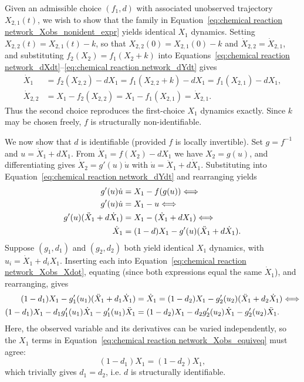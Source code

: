 \documentclass{article}
\theoremstyle{plain}
\theoremstyle{definition}
\begin{document}
{Given an admissible choice $(f_1, d)$ with associated unobserved trajectory $X_{2,1}(t)$, we wish to show that the family in Equation~\eqref{eq:chemical reaction network_Xobs_nonident_expr} yields identical $X_1$ dynamics. Setting $X_{2,2}(t) = X_{2,1}(t) - k$, so that $X_{2,2}(0) = X_{2,1}(0) - k$ and $\dot{X}_{2,2} = \dot{X}_{2,1}$, and substituting $f_2(X_2) = f_1(X_2+k)$ into Equations~\eqref{eq:chemical reaction network_dXdt}--\eqref{eq:chemical reaction network_dYdt} gives
\begin{align*}
    \dot{X}_1 &= f_2(X_{2,2}) - dX_1 = f_1(X_{2,2} + k) - dX_1 = f_1(X_{2,1}) - dX_1, \\
    \dot{X}_{2,2} &= X_1 - f_2(X_{2,2}) = X_1 - f_1(X_{2,1}) = \dot{X}_{2,1}.
\end{align*}
Thus the second choice reproduces the first-choice $X_1$ dynamics exactly. Since $k$ may be chosen freely, $f$ is structurally non-identifiable.

We now show that $d$ is identifiable (provided $f$ is locally invertible). Set $g = f^{-1}$ and $u = \dot{X}_1 + dX_1$. From $\dot{X}_1 = f(X_2) - dX_1$ we have $X_2 = g(u)$, and differentiating gives $\dot{X}_2 = g'(u)\dot{u}$ with $\dot{u} = \ddot{X}_1 + d\dot{X}_1$. Substituting into Equation~\eqref{eq:chemical reaction network_dYdt} and rearranging yields
\begin{align} 
    g'(u)\dot{u} &= X_1 - f(g(u)) \Longleftrightarrow \notag \\
    g'(u)\dot{u} &= X_1 - u \Longleftrightarrow \notag \\
    g'(u)(\ddot{X}_1 + d\dot{X}_1) &= X_1 - (\dot{X}_1 + dX_1) \Longleftrightarrow \notag \\
    \dot{X}_1 &= (1-d)X_1 - g'(u)(\ddot{X}_1 + d\dot{X}_1). \label{eq:chemical reaction network_Xobs_Xdot}
\end{align}
Suppose $(g_1, d_1)$ and $(g_2, d_2)$ both yield identical $X_1$ dynamics, with $u_i = \dot{X}_1 + d_iX_1$. Inserting each into Equation~\eqref{eq:chemical reaction network_Xobs_Xdot}, equating (since both expressions equal the same $\dot{X}_1$), and rearranging, gives
\begin{align}
    (1-d_1)X_1 - g_1'(u_1)(\ddot{X}_1 + d_1\dot{X}_1) &= \dot{X}_1 = (1-d_2)X_1 - g_2'(u_2)(\ddot{X}_1 + d_2\dot{X}_1) \notag \Longleftrightarrow \\
    (1-d_1)X_1 -  d_1g_1'(u_1)\dot{X}_1 - g_1'(u_1)\ddot{X}_1 &= (1-d_2)X_1 -  d_2g_2'(u_2)\dot{X}_1 - g_2'(u_2)\ddot{X}_1. \label{eq:chemical reaction network_Xobs_equiveq}
\end{align}
Here, the observed variable and its derivatives can be varied independently, so the $X_1$ terms in Equation~\eqref{eq:chemical reaction network_Xobs_equiveq} must agree:
\begin{equation*}
    (1-d_1)X_1 = (1-d_2)X_1, 
\end{equation*}
which trivially gives $d_1 = d_2$, i.e. $d$ is structurally identifiable.

}
\end{document}
